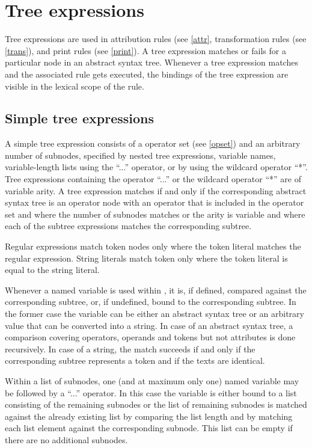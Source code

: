 \chapter{Tree expressions}\label{treeexpr}

Tree expressions are used in attribution rules (see \ref{attr},
transformation rules (see \ref{trans}), and print rules (see
\ref{print}). A tree expression matches or fails for a particular node
in an abstract syntax tree. Whenever a tree expression matches and the
associated rule gets executed, the bindings of the tree expression are
visible in the lexical scope of the rule.

\section{Simple tree expressions}

A simple tree expression consists of a operator set (see \ref{opset}) and an arbitrary number of subnodes, specified
by nested tree expressions, variable names, variable-length lists
using the ``...'' operator, or by using the wildcard operator
``*''. Tree expressions containing the operator ``...'' or the wildcard
operator ``*'' are of variable arity.  A tree
expression matches if and only if the corresponding abstract syntax tree
is an operator node with an operator that is included in the operator
set and where the number of subnodes matches or the arity is variable and
where each of the subtree expressions matches the corresponding subtree.

Regular expressions match token nodes only
where the token literal matches the regular expression. String literals
match token only where the token literal is equal to the string literal.

Whenever a named variable is used within , it
is, if defined, compared against the corresponding subtree, or, if
undefined, bound to the corresponding subtree. In the former case the
variable can be either an abstract syntax tree or an arbitrary value
that can be converted into a string. In case of an abstract syntax tree,
a comparison covering operators, operands and tokens but not attributes
is done recursively. In case of a string, the match succeeds if and only
if the corresponding subtree represents a token and if the texts are
identical.

Within a list of subnodes, one (and at maximum only one) named variable
may be followed by a ``...'' operator. In this case the variable is
either bound to a list consisting of the remaining subnodes or the list
of remaining subnodes is matched against the already existing list by
comparing the list length and by matching each list element against the
corresponding subnode. This list can be empty if there are no additional
subnodes.

